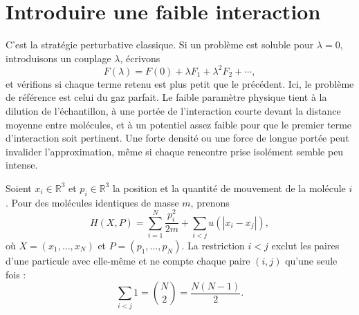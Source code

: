 \section{Introduire une faible interaction}

\begin{classroomqa}
\end{classroomqa}

C’est la stratégie perturbative classique. Si un problème est soluble pour \(\lambda=0\), introduisons un couplage \(\lambda\), écrivons
\begin{equation}
 F(\lambda)=F(0)+\lambda F_1+\lambda^2F_2+\cdots,
 \label{eq:sm6-perturbative-template}
\end{equation}
et vérifions si chaque terme retenu est plus petit que le précédent. Ici, le problème de référence est celui du gaz parfait. Le faible paramètre physique tient à la dilution de l’échantillon, à une portée de l’interaction courte devant la distance moyenne entre molécules, et à un potentiel assez faible pour que le premier terme d’interaction soit pertinent. Une forte densité ou une force de longue portée peut invalider l’approximation, même si chaque rencontre prise isolément semble peu intense.

Soient \(x_i\in\mathbb R^3\) et \(p_i\in\mathbb R^3\) la position et la quantité de mouvement de la molécule \(i\). Pour des molécules identiques de masse \(m\), prenons
\begin{equation}
 H(X,P)=
 \sum_{i=1}^{N}\frac{p_i^2}{2m}
 +\sum_{i<j}u\!\left(|x_i-x_j|\right),
 \label{eq:sm6-interacting-hamiltonian}
\end{equation}
où \(X=(x_1,\ldots,x_N)\) et \(P=(p_1,\ldots,p_N)\). La restriction \(i<j\) exclut les paires d’une particule avec elle-même et ne compte chaque paire \((i,j)\) qu’une seule fois :
\begin{equation}
 \sum_{i<j}1=\binom{N}{2}=\frac{N(N-1)}{2}.
 \label{eq:sm6-pair-count}
\end{equation}

\begin{classroomqa}
\end{classroomqa}


